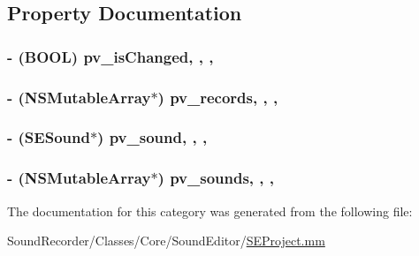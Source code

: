 \subsection{Property Documentation}
\hypertarget{category_s_e_project_07_08_ac3ea8d84f56007c0b810c3d9bdf14192}{
\subsubsection[{pv\-\_\-is\-Changed}]{\setlength{\rightskip}{0pt plus 5cm}-\/ (B\-O\-O\-L) pv\-\_\-is\-Changed\hspace{0.3cm}{\ttfamily [read]}, {\ttfamily [write]}, {\ttfamily [nonatomic]}, {\ttfamily [assign]}}}\label{category_s_e_project_07_08_ac3ea8d84f56007c0b810c3d9bdf14192}
\hypertarget{category_s_e_project_07_08_ae2c8be64c26691c643438545604ef2e2}{
\subsubsection[{pv\-\_\-records}]{\setlength{\rightskip}{0pt plus 5cm}-\/ (N\-S\-Mutable\-Array$\ast$) pv\-\_\-records\hspace{0.3cm}{\ttfamily [read]}, {\ttfamily [write]}, {\ttfamily [nonatomic]}, {\ttfamily [strong]}}}\label{category_s_e_project_07_08_ae2c8be64c26691c643438545604ef2e2}
\hypertarget{category_s_e_project_07_08_a081148966077ceef05f8f2c8fcade8bb}{
\subsubsection[{pv\-\_\-sound}]{\setlength{\rightskip}{0pt plus 5cm}-\/ ({\bf S\-E\-Sound}$\ast$) pv\-\_\-sound\hspace{0.3cm}{\ttfamily [read]}, {\ttfamily [write]}, {\ttfamily [nonatomic]}, {\ttfamily [strong]}}}\label{category_s_e_project_07_08_a081148966077ceef05f8f2c8fcade8bb}
\hypertarget{category_s_e_project_07_08_ab8fa4740c3d1a67a81ca45ac849ecaba}{
\subsubsection[{pv\-\_\-sounds}]{\setlength{\rightskip}{0pt plus 5cm}-\/ (N\-S\-Mutable\-Array$\ast$) pv\-\_\-sounds\hspace{0.3cm}{\ttfamily [read]}, {\ttfamily [write]}, {\ttfamily [nonatomic]}, {\ttfamily [strong]}}}\label{category_s_e_project_07_08_ab8fa4740c3d1a67a81ca45ac849ecaba}


The documentation for this category was generated from the following file\-:\begin{DoxyCompactItemize}
\item 
Sound\-Recorder/\-Classes/\-Core/\-Sound\-Editor/\hyperlink{_s_e_project_8mm}{S\-E\-Project.\-mm}\end{DoxyCompactItemize}

